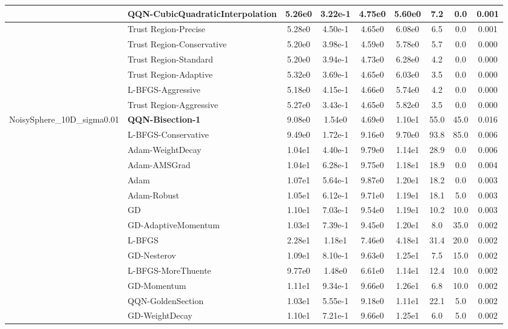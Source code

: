 \documentclass{article}
\begin{document}
\begin{longtable}{|l|l|c|c|c|c|c|c|c|}
\hline
 & QQN-CubicQuadraticInterpolation & 5.26e0 & 3.22e-1 & 4.75e0 & 5.60e0 & 7.2 & 0.0 & 0.001 \\
\hline
 & Trust Region-Precise & 5.28e0 & 4.50e-1 & 4.65e0 & 6.08e0 & 6.5 & 0.0 & 0.001 \\
\hline
 & Trust Region-Conservative & 5.20e0 & 3.98e-1 & 4.59e0 & 5.78e0 & 5.7 & 0.0 & 0.000 \\
\hline
 & Trust Region-Standard & 5.20e0 & 3.94e-1 & 4.73e0 & 6.28e0 & 4.2 & 0.0 & 0.000 \\
\hline
 & Trust Region-Adaptive & 5.32e0 & 3.69e-1 & 4.65e0 & 6.03e0 & 3.5 & 0.0 & 0.000 \\
\hline
 & L-BFGS-Aggressive & 5.18e0 & 4.15e-1 & 4.66e0 & 5.74e0 & 4.2 & 0.0 & 0.000 \\
\hline
 & Trust Region-Aggressive & 5.27e0 & 3.43e-1 & 4.65e0 & 5.82e0 & 3.5 & 0.0 & 0.000 \\
NoisySphere\_10D\_sigma0.01 & \textbf{QQN-Bisection-1} & 9.08e0 & 1.54e0 & 4.69e0 & 1.10e1 & 55.0 & 45.0 & 0.016 \\
\hline
 & L-BFGS-Conservative & 9.49e0 & 1.72e-1 & 9.16e0 & 9.70e0 & 93.8 & 85.0 & 0.006 \\
\hline
 & Adam-WeightDecay & 1.04e1 & 4.40e-1 & 9.79e0 & 1.14e1 & 28.9 & 0.0 & 0.006 \\
\hline
 & Adam-AMSGrad & 1.04e1 & 6.28e-1 & 9.75e0 & 1.18e1 & 18.9 & 0.0 & 0.004 \\
\hline
 & Adam & 1.07e1 & 5.64e-1 & 9.87e0 & 1.20e1 & 18.2 & 0.0 & 0.003 \\
\hline
 & Adam-Robust & 1.05e1 & 6.12e-1 & 9.71e0 & 1.19e1 & 18.1 & 5.0 & 0.003 \\
\hline
 & GD & 1.10e1 & 7.03e-1 & 9.54e0 & 1.19e1 & 10.2 & 10.0 & 0.003 \\
\hline
 & GD-AdaptiveMomentum & 1.03e1 & 7.39e-1 & 9.45e0 & 1.20e1 & 8.0 & 35.0 & 0.002 \\
\hline
 & L-BFGS & 2.28e1 & 1.18e1 & 7.46e0 & 4.18e1 & 31.4 & 20.0 & 0.002 \\
\hline
 & GD-Nesterov & 1.09e1 & 8.10e-1 & 9.63e0 & 1.25e1 & 7.5 & 15.0 & 0.002 \\
\hline
 & L-BFGS-MoreThuente & 9.77e0 & 1.48e0 & 6.61e0 & 1.14e1 & 12.4 & 10.0 & 0.002 \\
\hline
 & GD-Momentum & 1.11e1 & 9.34e-1 & 9.66e0 & 1.26e1 & 6.8 & 10.0 & 0.002 \\
\hline
 & QQN-GoldenSection & 1.03e1 & 5.55e-1 & 9.18e0 & 1.11e1 & 22.1 & 5.0 & 0.002 \\
\hline
 & GD-WeightDecay & 1.10e1 & 7.21e-1 & 9.66e0 & 1.25e1 & 6.0 & 5.0 & 0.002 \\

\end{longtable}
\end{document}
